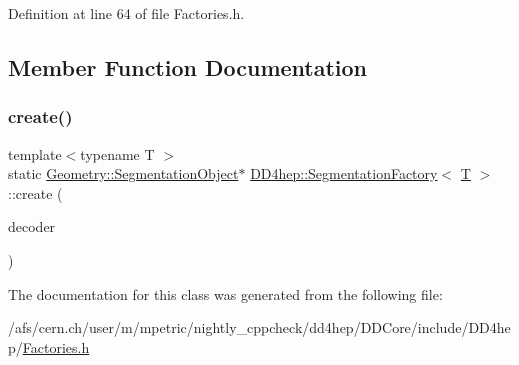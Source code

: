 Definition at line 64 of file Factories.\+h.



\subsection{Member Function Documentation}
\hypertarget{class_d_d4hep_1_1_segmentation_factory_a57196e0678ec341aa3e0463334a723b4}{}\label{class_d_d4hep_1_1_segmentation_factory_a57196e0678ec341aa3e0463334a723b4} 
\subsubsection{\texorpdfstring{create()}{create()}}
{\footnotesize\ttfamily template$<$typename T $>$ \\
static \hyperlink{class_d_d4hep_1_1_geometry_1_1_segmentation_object}{Geometry\+::\+Segmentation\+Object}$\ast$ \hyperlink{class_d_d4hep_1_1_segmentation_factory}{D\+D4hep\+::\+Segmentation\+Factory}$<$ \hyperlink{class_t}{T} $>$\+::create (\begin{DoxyParamCaption}\item[{\hyperlink{class_d_d4hep_1_1_d_d_segmentation_1_1_bit_field64}{D\+D\+Segmentation\+::\+Bit\+Field64} $\ast$}]{decoder }\end{DoxyParamCaption})\hspace{0.3cm}{\ttfamily [static]}}



The documentation for this class was generated from the following file\+:\begin{DoxyCompactItemize}
\item 
/afs/cern.\+ch/user/m/mpetric/nightly\+\_\+cppcheck/dd4hep/\+D\+D\+Core/include/\+D\+D4hep/\hyperlink{_d_d_core_2include_2_d_d4hep_2_factories_8h}{Factories.\+h}\end{DoxyCompactItemize}
